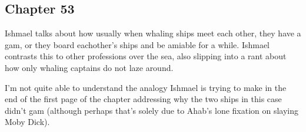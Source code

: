 \subsection{Chapter 53}

Ishmael talks about how usually when whaling ships meet each other, they have a
gam, or they board eachother's ships and be amiable for a while. Ishmael
contrasts this to other professions over the sea, also slipping into a rant
about how only whaling captains do not laze around.

I'm not quite able to understand the analogy Ishmael is trying to make in the
end of the first page of the chapter addressing why the two ships in this case
didn't gam (although perhaps that's solely due to Ahab's lone fixation on
slaying Moby Dick).
